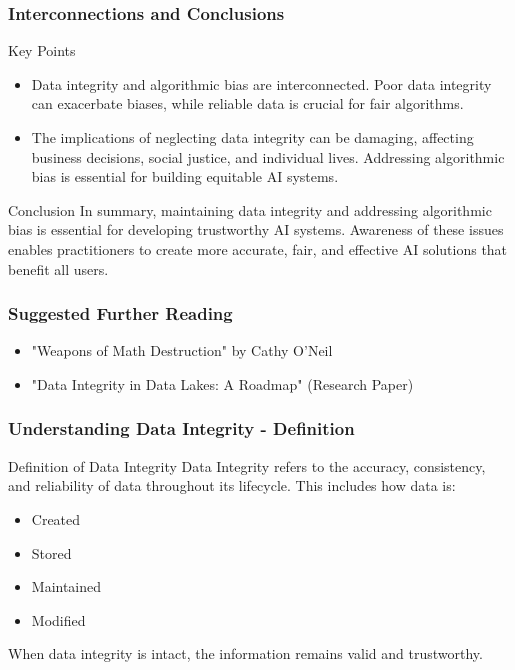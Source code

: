 \documentclass{beamer}
\begin{document}
\begin{frame}[fragile]
    \frametitle{Interconnections and Conclusions}
    \begin{block}{Key Points}
        \begin{itemize}
            \item Data integrity and algorithmic bias are interconnected. Poor data integrity can exacerbate biases, while reliable data is crucial for fair algorithms.
            \item The implications of neglecting data integrity can be damaging, affecting business decisions, social justice, and individual lives. Addressing algorithmic bias is essential for building equitable AI systems.
        \end{itemize}
    \end{block}
    
    \begin{block}{Conclusion}
        In summary, maintaining data integrity and addressing algorithmic bias is essential for developing trustworthy AI systems. Awareness of these issues enables practitioners to create more accurate, fair, and effective AI solutions that benefit all users.
    \end{block}
\end{frame}

\begin{frame}[fragile]
    \frametitle{Suggested Further Reading}
    \begin{itemize}
        \item "Weapons of Math Destruction" by Cathy O'Neil
        \item "Data Integrity in Data Lakes: A Roadmap" (Research Paper)
    \end{itemize}
\end{frame}

\begin{frame}[fragile]
    \frametitle{Understanding Data Integrity - Definition}
    \begin{block}{Definition of Data Integrity}
        Data Integrity refers to the accuracy, consistency, and reliability of data throughout its lifecycle. This includes how data is:
        \begin{itemize}
            \item Created
            \item Stored
            \item Maintained
            \item Modified
        \end{itemize}
        When data integrity is intact, the information remains valid and trustworthy.
    \end{block}
\end{frame}
\end{document}
